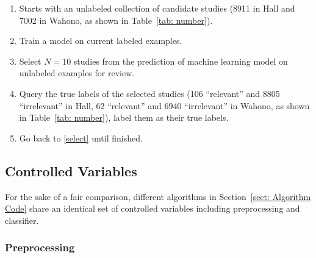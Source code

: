 \documentclass[final,twocolumn,5p]{elsarticle}
\theoremstyle{break}
\begin{document}
\begin{enumerate}
\item
Starts with an unlabeled collection of candidate studies (8911 in Hall and 7002 in Wahono, as shown in Table~\ref{tab: number}).

\item
\label{select}
Train a model on current labeled examples.

\item
Select $N=10$ studies from the prediction of machine learning model on unlabeled examples for review.

\item
Query the true labels of the selected studies (106 ``relevant'' and 8805 ``irrelevant'' in Hall, 62 ``relevant'' and 6940 ``irrelevant'' in Wahono, as shown in Table~\ref{tab: number}), label them as their true labels.

\item
Go back to \ref{select} until finished.

\end{enumerate}


\subsection{Controlled Variables}
\label{subsect: Controlled Variables}

For the sake of a fair comparison, different algorithms in Section~\ref{sect: Algorithm Code} share an identical set of controlled variables including preprocessing and classifier. 

\subsubsection{Preprocessing}
\end{document}
